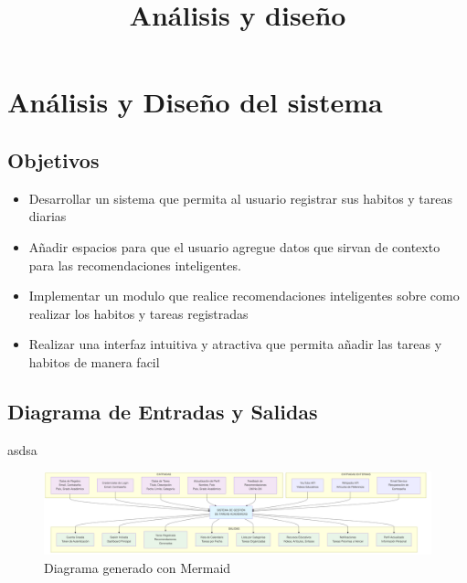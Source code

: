 \documentclass{pretexto/report}
\title{Análisis y diseño}
\begin{document}

                                                     

\tableofcontents 
\pagebreak



\pagebreak
\section{Análisis y Diseño del sistema}

\subsection{Objetivos}

\begin{itemize}
    \item Desarrollar un sistema que permita al usuario registrar sus habitos y tareas diarias
    \item Añadir espacios para que el usuario agregue datos que sirvan de contexto para las recomendaciones inteligentes.
    \item Implementar un modulo que realice recomendaciones inteligentes sobre como realizar los habitos y tareas registradas
    \item Realizar una interfaz intuitiva y atractiva que permita añadir las tareas y habitos de manera facil
\end{itemize}


\subsection{Diagrama de Entradas y Salidas}

asdsa
\begin{figure}[H]
    \centering
    \includegraphics[width=\linewidth]{pngs/e_s.png}
    \caption{Diagrama generado con Mermaid}
\end{figure}
\end{document}
